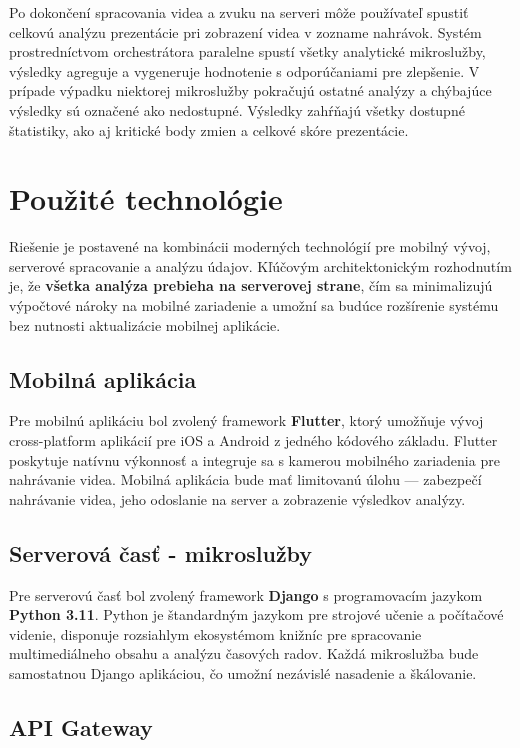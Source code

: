 Po dokončení spracovania videa a zvuku na serveri môže používateľ spustiť celkovú analýzu prezentácie pri zobrazení videa v zozname nahrávok.
Systém prostredníctvom orchestrátora paralelne spustí všetky analytické mikroslužby, výsledky agreguje a vygeneruje hodnotenie s odporúčaniami pre zlepšenie.
V prípade výpadku niektorej mikroslužby pokračujú ostatné analýzy a chýbajúce výsledky sú označené ako nedostupné.
Výsledky zahŕňajú všetky dostupné štatistiky, ako aj kritické body zmien a celkové skóre prezentácie.

\section{Použité technológie}

Riešenie je postavené na kombinácii moderných technológií pre mobilný vývoj, serverové spracovanie a analýzu údajov. Kľúčovým architektonickým rozhodnutím je, že \textbf{všetka analýza prebieha na serverovej strane}, čím sa minimalizujú výpočtové nároky na mobilné zariadenie a umožní sa budúce rozšírenie systému bez nutnosti aktualizácie mobilnej aplikácie.

\subsection{Mobilná aplikácia}

Pre mobilnú aplikáciu bol zvolený framework \textbf{Flutter}\cite{flutter}, ktorý umožňuje vývoj cross-platform aplikácií pre iOS a Android z jedného kódového základu. Flutter poskytuje natívnu výkonnosť a integruje sa s kamerou mobilného zariadenia pre nahrávanie videa. Mobilná aplikácia bude mať limitovanú úlohu --- zabezpečí nahrávanie videa, jeho odoslanie na server a zobrazenie výsledkov analýzy.

\subsection{Serverová časť - mikroslužby}

Pre serverovú časť bol zvolený framework \textbf{Django} s programovacím jazykom \textbf{Python 3.11}.\cite{django}
Python je štandardným jazykom pre strojové učenie a počítačové videnie, disponuje rozsiahlym ekosystémom knižníc pre spracovanie multimediálneho obsahu a analýzu časových radov. Každá mikroslužba bude samostatnou Django aplikáciou, čo umožní nezávislé nasadenie a škálovanie.

\subsection{API Gateway}

